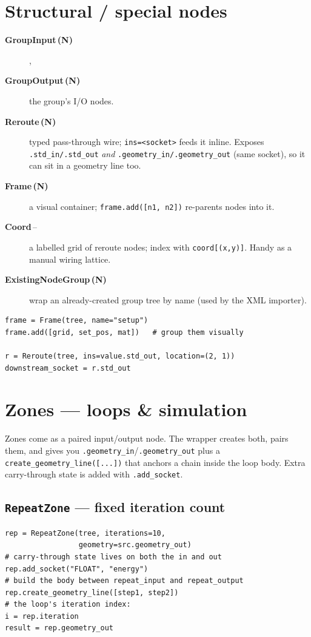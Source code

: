 \documentclass[10pt,a4paper,twocolumn]{article}
\newcommand{\code}[1]{\texttt{\small #1}}
\newcommand{\Nn}{\textcolor{graynode}{\textbf{(N)}}}
\newcommand{\cls}[3]{\item[\textbf{#1}\,#2] #3}
\begin{document}
\section{Structural / special nodes}

\begin{description}
\cls{GroupInput}{\Nn}, \cls{GroupOutput}{\Nn}{the group's I/O nodes.}
\cls{Reroute}{\Nn}{typed pass-through wire; \code{ins=<socket>} feeds it
  inline. Exposes \code{.std\_in/.std\_out} \emph{and}
  \code{.geometry\_in/.geometry\_out} (same socket), so it can sit in a
  geometry line too.}
\cls{Frame}{\Nn}{a visual container; \code{frame.add([n1, n2])}
  re-parents nodes into it.}
\cls{Coord}{--}{a labelled grid of reroute nodes; index with
  \code{coord[(x,y)]}. Handy as a manual wiring lattice.}
\cls{ExistingNodeGroup}{\Nn}{wrap an already-created group tree by name
  (used by the XML importer).}
\end{description}

\begin{lstlisting}
frame = Frame(tree, name="setup")
frame.add([grid, set_pos, mat])   # group them visually

r = Reroute(tree, ins=value.std_out, location=(2, 1))
downstream_socket = r.std_out
\end{lstlisting}

\section{Zones --- loops \& simulation}

Zones come as a paired input/output node. The wrapper creates both,
pairs them, and gives you \code{.geometry\_in}/\code{.geometry\_out} plus
a \code{create\_geometry\_line([...])} that anchors a chain inside the
loop body. Extra carry-through state is added with \code{.add\_socket}.

\subsection{\texttt{RepeatZone} --- fixed iteration count}
\begin{lstlisting}
rep = RepeatZone(tree, iterations=10,
                 geometry=src.geometry_out)
# carry-through state lives on both the in and out
rep.add_socket("FLOAT", "energy")
# build the body between repeat_input and repeat_output
rep.create_geometry_line([step1, step2])
# the loop's iteration index:
i = rep.iteration
result = rep.geometry_out
\end{lstlisting}
\end{document}
